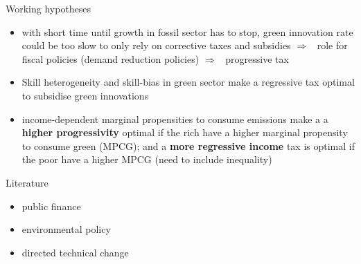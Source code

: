 \documentclass[11pt,aspectratio=169]{beamer}
\newcommand{\ar}{$\Rightarrow$ \ }
\begin{document}
\begin{frame}{Working hypotheses}	
	\begin{itemize}
		\item<+-> with short time until growth in fossil sector has to stop, green innovation rate could be too slow to only rely on corrective taxes and subsidies \ar role for fiscal policies (demand reduction policies) \ar progressive tax
		\vspace{3mm}
		\item<+-> Skill heterogeneity and skill-bias in green sector make a regressive tax optimal to subsidise green innovations
		\vspace{3mm}
		\item<+-> income-dependent marginal propensities to consume emissions make a a \textbf{higher progressivity} optimal if the rich have a higher marginal propensity to consume green (MPCG); and a \textbf{more regressive income} tax is optimal if the poor have a higher MPCG (need to include inequality) 
	\end{itemize}
\end{frame}



\begin{frame}{Literature}
	\begin{itemize}
		\item public finance
		\item environmental policy
		\item directed technical change
	\end{itemize}
\end{frame}
\end{document}
